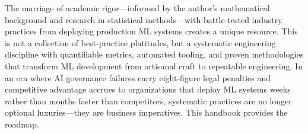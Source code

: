 \documentclass[11pt]{book}
\begin{document}
The marriage of academic rigor—informed by the author's mathematical background and research in statistical methods—with battle-tested industry practices from deploying production ML systems creates a unique resource. This is not a collection of best-practice platitudes, but a systematic engineering discipline with quantifiable metrics, automated tooling, and proven methodologies that transform ML development from artisanal craft to repeatable engineering. In an era where AI governance failures carry eight-figure legal penalties and competitive advantage accrues to organizations that deploy ML systems weeks rather than months faster than competitors, systematic practices are no longer optional luxuries—they are business imperatives. This handbook provides the roadmap.

\tableofcontents

\mainmatter

















\appendix


\end{document}
